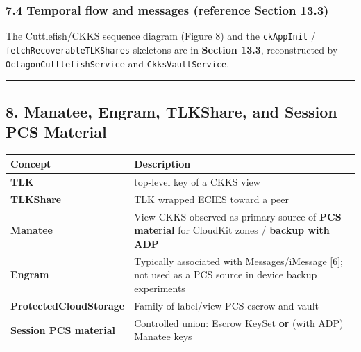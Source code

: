 \documentclass[
  english,
  10pt]{article}
\newcounter{none} %
\begin{document}
\subsubsection{7.4 Temporal flow and messages (reference Section
13.3)}\label{temporal-flow-and-messages-reference-section-13.3}

The Cuttlefish/CKKS sequence diagram (Figure 8) and the
\texttt{ckAppInit} / \texttt{fetchRecoverableTLKShares} skeletons are in
\textbf{Section 13.3}, reconstructed by
\texttt{OctagonCuttlefishService} and \texttt{CkksVaultService}.

\begin{center}\rule{0.5\linewidth}{0.5pt}\end{center}

\subsection{8. Manatee, Engram, TLKShare, and Session PCS
Material}\label{manatee-engram-tlkshare-and-session-pcs-material}

{\def\LTcaptype{none} %
\begin{longtable}[]{@{}
  >{\raggedright\arraybackslash}p{}
  >{\raggedright\arraybackslash}p{}@{}}
\toprule\noalign{}
\begin{minipage}[b]{\linewidth}\raggedright
Concept
\end{minipage} & \begin{minipage}[b]{\linewidth}\raggedright
Description
\end{minipage} \\
\midrule\noalign{}
\endhead
\bottomrule\noalign{}
\endlastfoot
\textbf{TLK} & top-level key of a CKKS view \\
\textbf{TLKShare} & TLK wrapped ECIES toward a peer \\
\textbf{Manatee} & View CKKS observed as primary source of \textbf{PCS
material} for CloudKit zones / \textbf{backup with ADP} \\
\textbf{Engram} & Typically associated with Messages/iMessage {[}6{]};
not used as a PCS source in device backup experiments \\
\textbf{ProtectedCloudStorage} & Family of label/view PCS escrow and
vault \\
\textbf{Session PCS material} & Controlled union: Escrow KeySet
\textbf{or} (with ADP) Manatee keys \\
\end{longtable}
}
\end{document}

